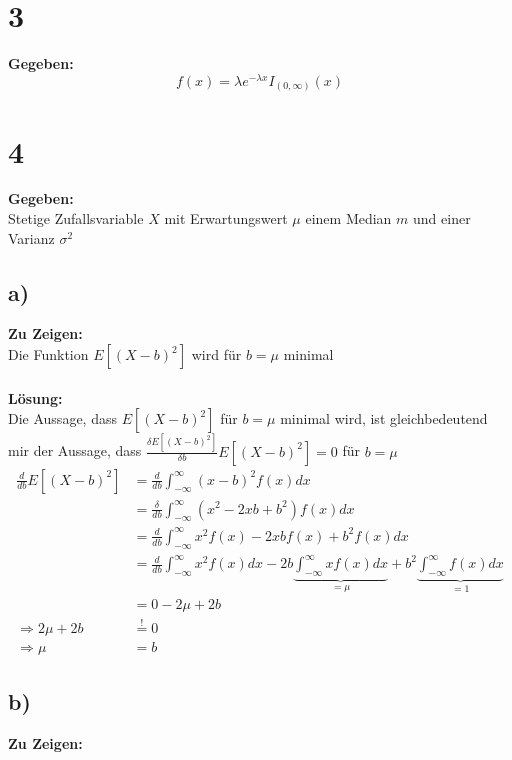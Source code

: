 \documentclass{article}
\begin{document}
\section*{3}
\textbf{Gegeben: } \\

\[f(x) = \lambda e^{-\lambda x} I_{(0, \infty)}(x)\]

\section*{4} 
\textbf{Gegeben:} \\

Stetige Zufallsvariable $X$ mit Erwartungswert $\mu$ einem Median $m$ und einer Varianz $\sigma^2$
\subsection*{a)}
\textbf{Zu Zeigen:} \\

Die Funktion $E[(X-b)^2]$ wird für $b = \mu$ minimal\\ \\
\textbf{Lösung:} \\
    
Die Aussage, dass $E[(X-b)^2]$ für $b = \mu$ minimal wird, ist gleichbedeutend mir der Aussage, dass $\frac{\delta E[(X-b)^2]}{\delta b} E[(X-b)^2] = 0$ für $b = \mu$
\begin{align*}
    \frac{d}{d b}E[(X-b)^2] &= \frac{d}{db} \int_{-\infty}^{\infty} (x-b)^2  f(x)  dx \\
    &= \frac{\delta}{db} \int_{-\infty}^{\infty} (x^2 - 2xb + b^2) f(x) dx \\
    &= \frac{d}{db} \int_{-\infty}^{\infty} x^2 f(x) - 2xb f(x) + b^2 f(x) dx \\
    &= \frac{d}{db} \int_{-\infty}^{\infty} x^2 f(x) dx - 2b \underbrace{\int_{-\infty}^{\infty} x f(x) dx}_{=\mu} + b^2 \underbrace{\int_{-\infty}^{\infty} f(x)  dx}_{= 1} \tag{Jetzt ableiten nach b}\\ 
    &= 0 - 2\mu + 2b \\ 
    \Rightarrow 2 \mu + 2b &\overset{!}{=} 0 \\
    \Longrightarrow \mu &= b 
\end{align*}

\subsection*{b)}
\textbf{Zu Zeigen:}\\
\end{document}

